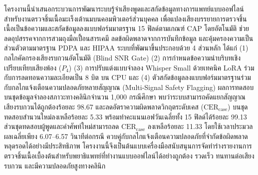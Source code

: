 โครงงานนี้นำเสนอกระบวนการพัฒนาระบบรู้จำเสียงพูดและสกัดข้อมูลทางการแพทย์แบบออฟไลน์สำหรับงานตรวจชิ้นเนื้อมะเร็งเต้านมบนคอมพิวเตอร์ส่วนบุคคล เพื่อแปลงเสียงบรรยายการตรวจชิ้นเนื้อเป็นข้อความและสกัดข้อมูลลงแบบฟอร์มมาตรฐาน 15 ฟิลด์ตามเกณฑ์ CAP โดยอัตโนมัติ ช่วยลดอุปสรรคจากการสวมถุงมือเปื้อนสารเคมี ลดข้อผิดพลาดจากการบันทึกข้อมูล และคุ้มครองความเป็นส่วนตัวตามมาตรฐาน PDPA และ HIPAA ระบบที่พัฒนาขึ้นประกอบด้วย 4 ส่วนหลัก ได้แก่ (1) กลไกคัดกรองเสียงรบกวนอัตโนมัติ (Blind SNR Gate) (2) การกำหนดข้อความนำบริบทเชิงเปรียบเทียบเสียงพ้อง ($P_4$) (3) การปรับแต่งแบบจำลอง Whisper Small ด้วยเทคนิค LoRA ร่วมกับการลดทอนความละเอียดเป็น 8 บิต บน CPU และ (4) ตัวสกัดข้อมูลลงแบบฟอร์มมาตรฐานร่วมกับกลไกแจ้งเตือนความปลอดภัยหลายสัญญาณ (Multi-Signal Safety Flagging) ผลการทดสอบบนชุดข้อมูลจำลองสภาวะทางคลินิกจำนวน 1,000 กรณีศึกษา พบว่าระบบสามารถคัดแยกสัญญาณเสียงรบกวนได้ถูกต้องร้อยละ 98.67 และลดอัตราความผิดพลาดวิกฤตระดับเคส ($\text{CER}_{\text{case}}$) บนชุดทดสอบสำนวนใหม่ลงเหลือร้อยละ 5.33 พร้อมทำคะแนนเอฟวันเฉลี่ยทั้ง 15 ฟิลด์ได้ร้อยละ 99.13 ส่วนชุดทดสอบผู้พูดและคำศัพท์ใหม่สามารถลด $\text{CER}_{\text{case}}$ ลงเหลือร้อยละ 11.33 โดยใช้เวลาประมวลผลเฉลี่ยเพียง 6.07--6.57 วินาทีต่อกรณี ควบคู่กับกลไกแจ้งเตือนความปลอดภัยที่จำกัดข้อผิดพลาดหลุดรอดได้อย่างมีประสิทธิภาพ โครงงานนี้จึงเป็นต้นแบบเครื่องมือสนับสนุนการจัดทำร่างรายงานการตรวจชิ้นเนื้อเบื้องต้นสำหรับพยาธิแพทย์ที่ทำงานแบบออฟไลน์ได้อย่างถูกต้อง รวดเร็ว ทนทานต่อเสียงรบกวน และมีความปลอดภัยสูงทางคลินิก